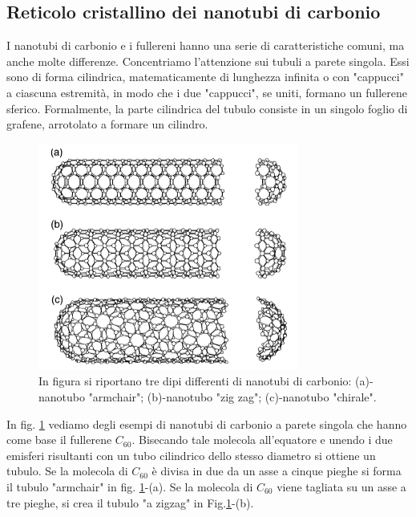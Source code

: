 \documentclass[a4paper,titlepage]{book}
\begin{document}
\subsection{Reticolo cristallino dei nanotubi di carbonio}
I nanotubi di carbonio e i fullereni hanno una serie di caratteristiche comuni, ma anche molte differenze. Concentriamo l'attenzione sui tubuli a parete singola. Essi sono di forma cilindrica, matematicamente di lunghezza infinita o con "cappucci" a ciascuna estremità, in modo che i due "cappucci", se uniti, formano un fullerene sferico. Formalmente, la parte cilindrica del tubulo consiste in un singolo foglio di grafene, arrotolato a formare un cilindro.
\begin{figure}[h!] 
	\centering
	\includegraphics[width=0.55\columnwidth]{nanotube.png}
	\caption{ 	\label{bohh}
		In figura si riportano tre dipi differenti di nanotubi di carbonio: (a)-nanotubo "armchair"; (b)-nanotubo "zig zag"; (c)-nanotubo "chirale".
	}
\end{figure}
In fig. \ref{bohh} vediamo degli esempi di nanotubi di carbonio a parete singola che hanno come base il fullerene $C_{60}$. Bisecando tale molecola all'equatore e unendo i due emisferi risultanti con un tubo cilindrico  dello stesso diametro si ottiene un tubulo. Se la molecola di $C_{60}$ è divisa in due da un asse a cinque pieghe si forma il tubulo "armchair" in fig. \ref{bohh}-(a).  Se la molecola di $C_{60}$ viene tagliata su un asse a tre pieghe, si crea il tubulo "a zigzag" in Fig.\ref{bohh}-(b).
\end{document}
